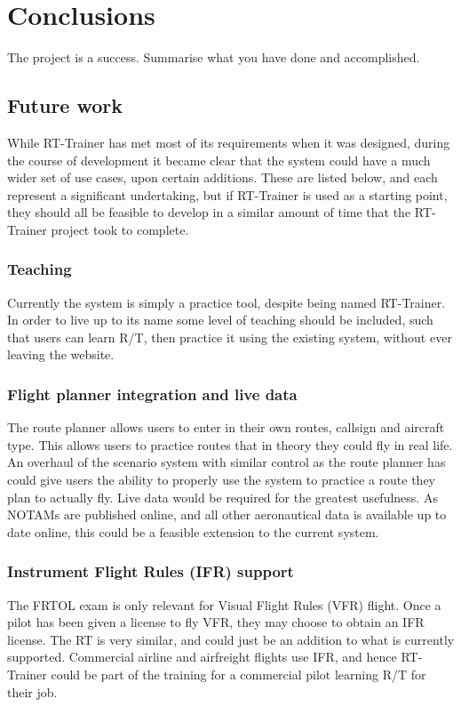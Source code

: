 \chapter{Conclusions}
\label{ch:conclusions}

The project is a success. Summarise what you have done and accomplished.

\section{Future work}
\label{FutureWork}

While RT-Trainer has met most of its requirements when it was designed, during the course of development it became clear that the system could have a much wider set of use cases, upon certain additions. These are listed below, and each represent a significant undertaking, but if RT-Trainer is used as a starting point, they should all be feasible to develop in a similar amount of time that the RT-Trainer project took to complete.

\subsection{Teaching}
Currently the system is simply a practice tool, despite being named RT-Trainer. In order to live up to its name some level of teaching should be included, such that users can learn R/T, then practice it using the existing system, without ever leaving the website.

\subsection{Flight planner integration and live data}
The route planner allows users to enter in their own routes, callsign and aircraft type. This allows users to practice routes that in theory they could fly in real life. An overhaul of the scenario system with similar control as the route planner has could give users the ability to properly use the system to practice a route they plan to actually fly. Live data would be required for the greatest usefulness. As NOTAMs are published online, and all other aeronautical data is available up to date online, this could be a feasible extension to the current system.

\subsection{Instrument Flight Rules (IFR) support}
The FRTOL exam is only relevant for Visual Flight Rules (VFR) flight. Once a pilot has been given a license to fly VFR, they may choose to obtain an IFR license. The RT is very similar, and could just be an addition to what is currently supported. Commercial airline and airfreight flights use IFR, and hence RT-Trainer could be part of the training for a commercial pilot learning R/T for their job.